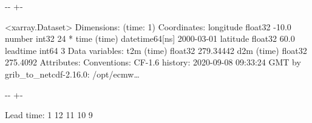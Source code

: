 \documentclass[letterpaper,10pt,english]{sphinxmanual}
\newlength\nbsphinxcodecellspacing
\begin{document}
{

\kern-\sphinxverbatimsmallskipamount\kern-\baselineskip
\kern+\FrameHeightAdjust\kern-\fboxrule
\vspace{\nbsphinxcodecellspacing}

\begin{sphinxVerbatim}[commandchars=\\\{\}]
\llap{\color{nbsphinxout}[8]:\,\hspace{\fboxrule}\hspace{\fboxsep}}<xarray.Dataset>
Dimensions:    (time: 1)
Coordinates:
    longitude  float32 -10.0
    number     int32 24
  * time       (time) datetime64[ns] 2000-03-01
    latitude   float32 60.0
    leadtime   int64 3
Data variables:
    t2m        (time) float32 279.34442
    d2m        (time) float32 275.4092
Attributes:
    Conventions:  CF-1.6
    history:      2020-09-08 09:33:24 GMT by grib\_to\_netcdf-2.16.0: /opt/ecmw{\ldots}
\end{sphinxVerbatim}
}

{
\begin{sphinxVerbatim}[commandchars=\\\{\}]
\llap{\color{nbsphinxin}[10]:\,\hspace{\fboxrule}\hspace{\fboxsep}}       \PYG{p}{[}\PYG{p}{]}
\end{sphinxVerbatim}
}

{

\kern-\sphinxverbatimsmallskipamount\kern-\baselineskip
\kern+\FrameHeightAdjust\kern-\fboxrule
\vspace{\nbsphinxcodecellspacing}

\begin{sphinxVerbatim}[commandchars=\\\{\}]
Lead time: 1
12
11
10
9
\end{sphinxVerbatim}
}
\end{document}
